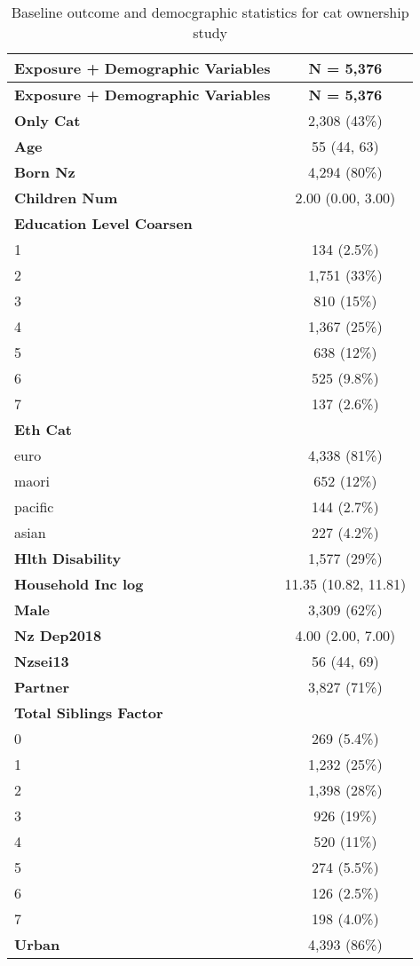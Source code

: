 \documentclass[
  singlecolumn,
  9pt]{article}
\begin{document}
\hypertarget{tbl-table_demographic_vars_cats}{}
\begin{longtable}[]{@{}lc@{}}
\caption{\label{tbl-table_demographic_vars_cats}Baseline outcome and
democgraphic statistics for cat ownership study}\tabularnewline
\toprule\noalign{}
\textbf{Exposure + Demographic Variables} & \textbf{N = 5,376} \\
\midrule\noalign{}
\endfirsthead
\toprule\noalign{}
\textbf{Exposure + Demographic Variables} & \textbf{N = 5,376} \\
\midrule\noalign{}
\endhead
\bottomrule\noalign{}
\endlastfoot
\textbf{Only Cat} & 2,308 (43\%) \\
\textbf{Age} & 55 (44, 63) \\
\textbf{Born Nz} & 4,294 (80\%) \\
\textbf{Children Num} & 2.00 (0.00, 3.00) \\
\textbf{Education Level Coarsen} & \\
1 & 134 (2.5\%) \\
2 & 1,751 (33\%) \\
3 & 810 (15\%) \\
4 & 1,367 (25\%) \\
5 & 638 (12\%) \\
6 & 525 (9.8\%) \\
7 & 137 (2.6\%) \\
\textbf{Eth Cat} & \\
euro & 4,338 (81\%) \\
maori & 652 (12\%) \\
pacific & 144 (2.7\%) \\
asian & 227 (4.2\%) \\
\textbf{Hlth Disability} & 1,577 (29\%) \\
\textbf{Household Inc log} & 11.35 (10.82, 11.81) \\
\textbf{Male} & 3,309 (62\%) \\
\textbf{Nz Dep2018} & 4.00 (2.00, 7.00) \\
\textbf{Nzsei13} & 56 (44, 69) \\
\textbf{Partner} & 3,827 (71\%) \\
\textbf{Total Siblings Factor} & \\
0 & 269 (5.4\%) \\
1 & 1,232 (25\%) \\
2 & 1,398 (28\%) \\
3 & 926 (19\%) \\
4 & 520 (11\%) \\
5 & 274 (5.5\%) \\
6 & 126 (2.5\%) \\
7 & 198 (4.0\%) \\
\textbf{Urban} & 4,393 (86\%) \\
\end{longtable}
\end{document}
